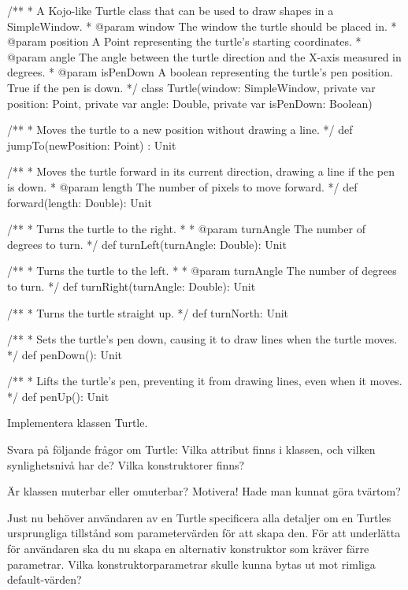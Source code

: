 \begin{Code}
/**
  * A Kojo-like Turtle class that can be used to draw shapes
    in a SimpleWindow.
  * @param window     The window the turtle should be placed in.
  * @param position   A Point representing the turtle's starting
                      coordinates.
  * @param angle      The angle between the turtle direction and
                      the X-axis measured in degrees.
  * @param isPenDown  A boolean representing the turtle's pen
                      position. True if the pen is down.
  */
class Turtle(window: SimpleWindow, private var position: Point,
      private var angle: Double, private var isPenDown: Boolean) {
  /**
    * Moves the turtle to a new position without drawing a line.
    */
  def jumpTo(newPosition: Point) : Unit

  /**
    * Moves the turtle forward in its current direction, drawing
      a line if the pen is down.
    * @param length The number of pixels to move forward.
    */
  def forward(length: Double): Unit

  /**
    * Turns the turtle to the right.
    *
    * @param turnAngle The number of degrees to turn.
    */
  def turnLeft(turnAngle: Double): Unit

  /**
    * Turns the turtle to the left.
    *
    * @param turnAngle The number of degrees to turn.
    */
  def turnRight(turnAngle: Double): Unit

  /**
    * Turns the turtle straight up.
    */
  def turnNorth: Unit

  /**
    * Sets the turtle's pen down, causing it to draw lines when
      the turtle moves.
    */
  def penDown(): Unit

  /**
    * Lifts the turtle's pen, preventing it from drawing lines,
      even when it moves.
    */
  def penUp(): Unit
}

\end{Code}

\Subtask Implementera klassen Turtle.

\Subtask Svara på följande frågor om Turtle: Vilka attribut finns i klassen, och vilken synlighetsnivå har de? Vilka konstruktorer finns? 

\Subtask Är klassen muterbar eller omuterbar? Motivera! Hade man kunnat göra tvärtom?

\Subtask Just nu behöver användaren av en Turtle specificera alla detaljer om en Turtles ursprungliga tillstånd som parametervärden för att skapa den. För att underlätta för användaren ska du nu skapa en alternativ konstruktor som kräver färre parametrar. Vilka konstruktorparametrar skulle kunna bytas ut mot rimliga default-värden?

